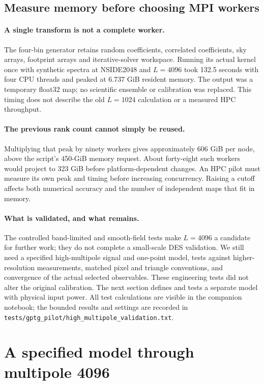 \documentclass[11pt]{article}
\begin{document}
\subsection{Measure memory before choosing MPI workers}
\paragraph{A single transform is not a complete worker.}
The four-bin generator retains random coefficients, correlated
coefficients, sky arrays, footprint arrays and iterative-solver workspace.
Running its actual kernel once with synthetic spectra at NSIDE2048 and
$L=4096$ took 132.5 seconds with four CPU threads and peaked at
6.737 GiB resident memory. The output was a temporary float32 map;
no scientific ensemble or calibration was replaced. This timing does
not describe the old $L=1024$ calculation or a measured HPC throughput.

\paragraph{The previous rank count cannot simply be reused.}
Multiplying that peak by ninety workers gives approximately 606 GiB per
node, above the script's 450-GiB memory request. About forty-eight such
workers would project to 323 GiB before platform-dependent changes.
An HPC pilot must measure its own peak and timing before increasing
concurrency. Raising a cutoff affects both numerical accuracy and the
number of independent maps that fit in memory.

\paragraph{What is validated, and what remains.}
The controlled band-limited and smooth-field tests make $L=4096$ a
candidate for further work; they do not complete a small-scale DES
validation. We still need a specified high-multipole signal and one-point
model, tests against higher-resolution measurements, matched pixel and
triangle conventions, and convergence of the actual selected observables.
These engineering tests did not alter the original calibration. The next
section defines and tests a separate model with physical input power.
All test calculations are visible in the companion notebook; the bounded
results and settings are recorded in
\texttt{tests/gptg\_pilot/high\_multipole\_validation.txt}.


\section{A specified model through multipole 4096}
\label{sec:physical4096}
\end{document}
